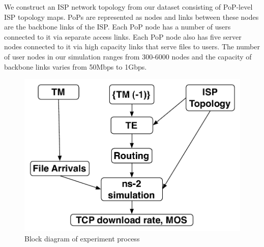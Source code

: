 We construct an ISP network topology from our dataset consisting of PoP-level ISP topology maps. PoPs are represented as nodes and links between these nodes are the backbone links of the ISP. Each PoP node has a number of users connected to it via separate access links. Each PoP node also has five server nodes connected to it via high capacity links that serve files to users. The number of user nodes in our simulation ranges from 300-6000 nodes and the capacity of backbone links varies from 50Mbps to 1Gbps.

\begin{figure}
 \begin{center}
\includegraphics[scale=0.4]{final_images/Simulation1.pdf}
\caption{Block diagram of experiment process}
 \end{center}
 \label{fig:simulation1}
 \end{figure}
 




